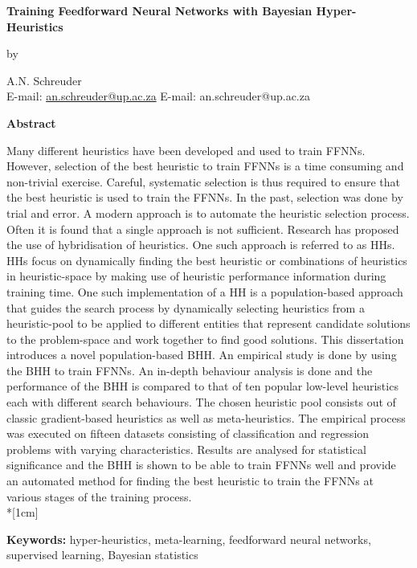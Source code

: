 \pagestyle{empty}

\begin{center}
    \Large
    \textbf{Training Feedforward Neural Networks with Bayesian Hyper-Heuristics}
    \vspace{0.5cm}

    \normalsize
    by
    \vspace{0.5cm}

    \normalsize
    A.N. Schreuder\\
    \ifpdf
        E-mail: \href{mailto:an.schreuder@up.ac.za}{an.schreuder@up.ac.za}
    \else
        E-mail: an.schreuder@up.ac.za
    \fi
    \vspace{1cm}

    \Large
    \textbf{Abstract}
\end{center}

Many different heuristics have been developed and used to train \acfp{FFNN}.  However, selection of the best heuristic to train
\acsp{FFNN} is a time consuming and non-trivial exercise. Careful, systematic
selection is thus required to ensure that the best heuristic is used to train the \acsp{FFNN}. In the past, selection
was done by trial and error. A modern approach is to automate the heuristic selection
process. Often it is found that a single approach is not sufficient. Research has
proposed the use of hybridisation of heuristics. One such approach is referred to
as \acfp{HH}. \acsp{HH} focus on dynamically finding the best heuristic or combinations of heuristics in
heuristic-space by making use of heuristic performance information during training time. One such
implementation of a \acs{HH} is a population-based approach that guides the search process by
dynamically selecting heuristics from a heuristic-pool to be applied to
different entities that represent candidate solutions to the problem-space and
work together to find good solutions. This dissertation introduces a novel population-based \Acf{BHH}. An empirical study is done by
using the \acs{BHH} to train \acsp{FFNN}. An in-depth behaviour analysis is done and the performance of the \acs{BHH} is compared to that of ten popular low-level heuristics each with different search
behaviours. The chosen heuristic pool consists out of classic gradient-based heuristics as well as meta-heuristics. The empirical process was executed on fifteen datasets consisting of classification and regression problems
with varying characteristics. Results are analysed for statistical significance and the \acs{BHH} is shown to be able to train \acsp{FFNN} well and provide an automated method for finding the best heuristic to train the \acsp{FFNN} at various stages of the training process.\\*[1cm]
\noindent
\parbox{\textwidth}{
    \textbf{Keywords:} hyper-heuristics, meta-learning, feedforward neural
    networks, supervised learning, Bayesian statistics
}
\vfill
\newpage

